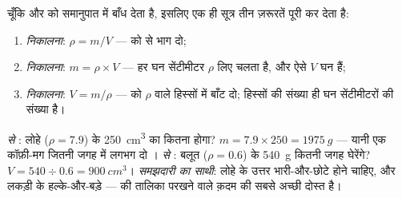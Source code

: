 \begin{proposition}[एक सूत्र में तीन नुस्ख़े]\label{prop:g7:volume-mass-density:recipes}
चूँकि   और  को समानुपात में बाँध देता है, इसलिए एक
ही सूत्र तीन ज़रूरतें पूरी कर देता है:
\begin{enumerate}
  \item \emph{ निकालना}: $\rho = m/V$ ---  को  से
        भाग दो;
  \item \emph{ निकालना}: $m = \rho \times V$ --- हर घन
        सेंटीमीटर $\rho$  लिए चलता है, और ऐसे $V$ घन हैं;
  \item \emph{ निकालना}: $V = m/\rho$ ---  को $\rho$
         वाले हिस्सों में बाँट दो; हिस्सों की संख्या ही घन
        सेंटीमीटरों की संख्या है।
\end{enumerate}
\end{proposition}

\begin{example}[नुस्ख़े काम पर]\label{ex:g7:volume-mass-density:atwork}
\emph{ से }: लोहे ($\rho = 7.9$) के \qty{250}{cm^3}
का  कितना होगा? $m = 7.9 \times 250 = \qty{1975}{g}$ --- यानी एक
कॉफ़ी-मग जितनी जगह में लगभग दो ।
\emph{ से }: बलूत ($\rho = 0.6$) के \qty{540}{g}
कितनी जगह घेरेंगे? $V = 540 \div 0.6 = \qty{900}{cm^3}$।
\emph{समझदारी का साथी}: लोहे के उत्तर भारी-और-छोटे होने चाहिए, और
लकड़ी के हल्के-और-बड़े ---  की तालिका परखने वाले क़दम की सबसे
अच्छी दोस्त है।
\end{example}

